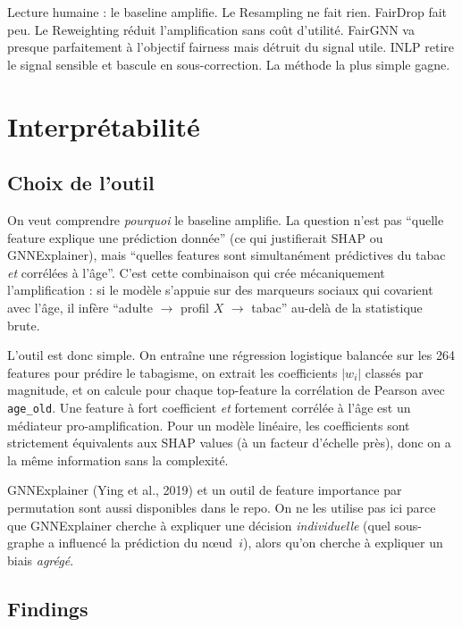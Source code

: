 \documentclass[10pt,a4paper,twocolumn]{article}
\begin{document}
Lecture humaine : le baseline amplifie. Le Resampling ne fait rien. FairDrop fait peu. Le Reweighting réduit l'amplification sans coût d'utilité. FairGNN va presque parfaitement à l'objectif fairness mais détruit du signal utile. INLP retire le signal sensible et bascule en sous-correction. La méthode la plus simple gagne.

\section{Interprétabilité}

\subsection{Choix de l'outil}

On veut comprendre \emph{pourquoi} le baseline amplifie. La question n'est pas ``quelle feature explique une prédiction donnée'' (ce qui justifierait SHAP ou GNNExplainer), mais ``quelles features sont simultanément prédictives du tabac \emph{et} corrélées à l'âge''. C'est cette combinaison qui crée mécaniquement l'amplification : si le modèle s'appuie sur des marqueurs sociaux qui covarient avec l'âge, il infère ``adulte $\rightarrow$ profil $X$ $\rightarrow$ tabac'' au-delà de la statistique brute.

L'outil est donc simple. On entraîne une régression logistique balancée sur les 264 features pour prédire le tabagisme, on extrait les coefficients $|w_i|$ classés par magnitude, et on calcule pour chaque top-feature la corrélation de Pearson avec \texttt{age\_old}. Une feature à fort coefficient \emph{et} fortement corrélée à l'âge est un médiateur pro-amplification. Pour un modèle linéaire, les coefficients sont strictement équivalents aux SHAP values (à un facteur d'échelle près), donc on a la même information sans la complexité.

GNNExplainer (Ying et al., 2019) et un outil de feature importance par permutation sont aussi disponibles dans le repo. On ne les utilise pas ici parce que GNNExplainer cherche à expliquer une décision \emph{individuelle} (quel sous-graphe a influencé la prédiction du nœud~$i$), alors qu'on cherche à expliquer un biais \emph{agrégé}.

\subsection{Findings}
\end{document}
